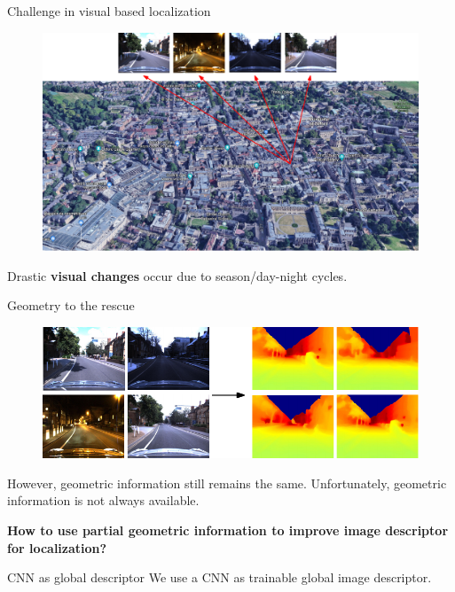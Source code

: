 \documentclass[final]{beamer}
\newlength{\colwidth}
\begin{document}
\begin{frame}[t]
\begin{columns}[t]
\begin{column}{\colwidth}
  \begin{block}{Challenge in visual based localization}
	\begin{figure}
		\includegraphics[width=\linewidth]{vect/intro/fig4/1}
	\end{figure}		
    Drastic \textbf{visual changes} occur due to season/day-night cycles.
  \end{block}

  \begin{block}{Geometry to the rescue}

	\begin{figure}
		\centering
		\includegraphics[width=0.8\linewidth]{vect/intro/fig4/2}
	\end{figure}

	However, {geometric information} still remains the same. Unfortunately, geometric information is not always available.

	\textbf{How to use partial geometric information to improve image descriptor for localization?}
  \end{block}

  \begin{block}{CNN as global descriptor}
    We use a CNN as trainable global image descriptor.
    

\end{block}
\end{column}
\end{columns}
\end{frame}
\end{document}

